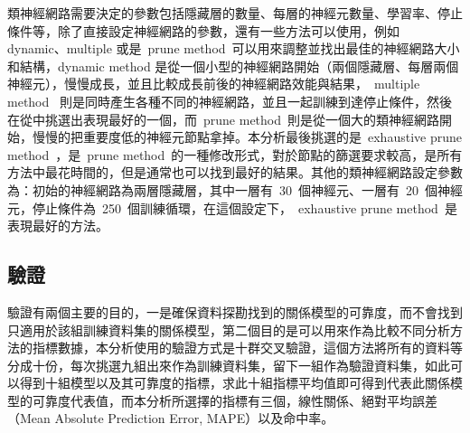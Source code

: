 類神經網路需要決定的參數包括隱藏層的數量、每層的神經元數量、學習率、停止條件等，除了直接設定神經網路的參數，還有一些方法可以使用，例如 dynamic、multiple 或是~prune method~可以用來調整並找出最佳的神經網路大小和結構，dynamic method 是從一個小型的神經網路開始（兩個隱藏層、每層兩個神經元），慢慢成長，並且比較成長前後的神經網路效能與結果，~multiple method~ 則是同時產生各種不同的神經網路，並且一起訓練到達停止條件，然後在從中挑選出表現最好的一個，而~prune method~則是從一個大的類神經網路開始，慢慢的把重要度低的神經元節點拿掉。本分析最後挑選的是~exhaustive prune method~，是~prune method~的一種修改形式，對於節點的篩選要求較高，是所有方法中最花時間的，但是通常也可以找到最好的結果。其他的類神經網路設定參數為：初始的神經網路為兩層隱藏層，其中一層有~30~個神經元、一層有~20~個神經元，停止條件為~250~個訓練循環，在這個設定下，~exhaustive prune method~是表現最好的方法。



\subsection{驗證}

驗證有兩個主要的目的，一是確保資料探勘找到的關係模型的可靠度，而不會找到只適用於該組訓練資料集的關係模型，第二個目的是可以用來作為比較不同分析方法的指標數據，本分析使用的驗證方式是十群交叉驗證，這個方法將所有的資料等分成十份，每次挑選九組出來作為訓練資料集，留下一組作為驗證資料集，如此可以得到十組模型以及其可靠度的指標，求此十組指標平均值即可得到代表此關係模型的可靠度代表值，而本分析所選擇的指標有三個，線性關係、絕對平均誤差（Mean Absolute Prediction Error, MAPE）以及命中率。

